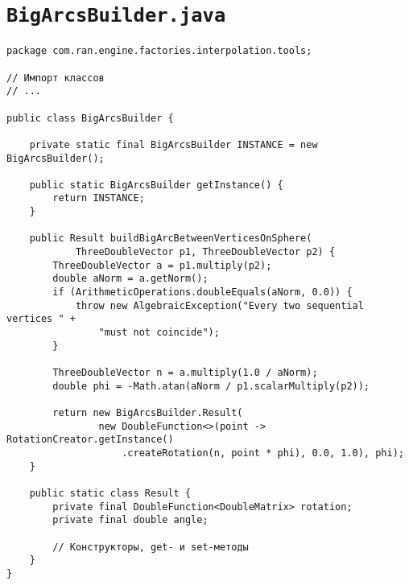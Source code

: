 \section*{\texttt{BigArcsBuilder.java}}
\begin{verbatim}
package com.ran.engine.factories.interpolation.tools;

// Импорт классов
// ...

public class BigArcsBuilder {

    private static final BigArcsBuilder INSTANCE = new BigArcsBuilder();

    public static BigArcsBuilder getInstance() {
        return INSTANCE;
    }

    public Result buildBigArcBetweenVerticesOnSphere(
            ThreeDoubleVector p1, ThreeDoubleVector p2) {
        ThreeDoubleVector a = p1.multiply(p2);
        double aNorm = a.getNorm();
        if (ArithmeticOperations.doubleEquals(aNorm, 0.0)) {
            throw new AlgebraicException("Every two sequential vertices " +
                "must not coincide");
        }

        ThreeDoubleVector n = a.multiply(1.0 / aNorm);
        double phi = -Math.atan(aNorm / p1.scalarMultiply(p2));

        return new BigArcsBuilder.Result(
                new DoubleFunction<>(point -> RotationCreator.getInstance()
                    .createRotation(n, point * phi), 0.0, 1.0), phi);
    }

    public static class Result {
        private final DoubleFunction<DoubleMatrix> rotation;
        private final double angle;

        // Конструкторы, get- и set-методы
    }
}
\end{verbatim}

